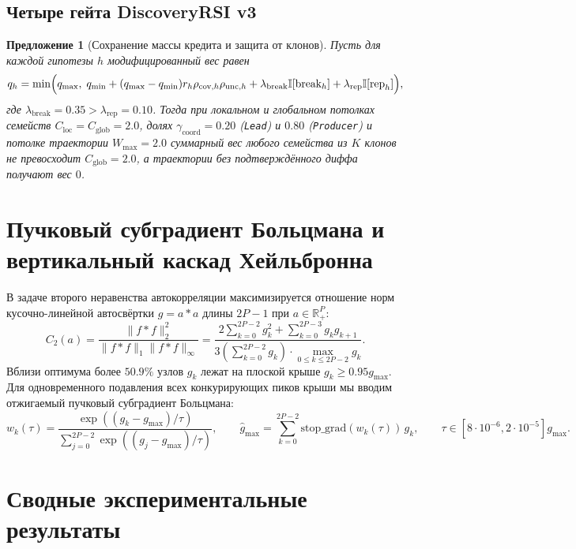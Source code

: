 \documentclass[11pt,a4paper]{article}
\newtheorem{proposition}{Предложение}
\begin{document}
\subsection{Четыре гейта DiscoveryRSI v3}
\begin{proposition}[Сохранение массы кредита и защита от клонов]
Пусть для каждой гипотезы $h$ модифицированный вес равен
\begin{equation}
q_h = \min\Bigl(q_{\max}, \; q_{\min} + (q_{\max} - q_{\min}) r_h \rho_{\text{cov}, h} \rho_{\text{unc}, h} + \lambda_{\text{break}}\mathbb{I}[\text{break}_h] + \lambda_{\text{rep}}\mathbb{I}[\text{rep}_h]\Bigr),
\end{equation}
где $\lambda_{\text{break}} = 0.35 > \lambda_{\text{rep}} = 0.10$. Тогда при локальном и глобальном потолках семейств $C_{\text{loc}} = C_{\text{glob}} = 2.0$, долях $\gamma_{\text{coord}} = 0.20$ (\texttt{Lead}) и $0.80$ (\texttt{Producer}) и потолке траектории $W_{\max} = 2.0$ суммарный вес любого семейства из $K$ клонов не превосходит $C_{\text{glob}} = 2.0$, а траектории без подтверждённого диффа получают вес $0$.
\end{proposition}

\section{Пучковый субградиент Больцмана и вертикальный каскад Хейльбронна}

В задаче второго неравенства автокорреляции максимизируется отношение норм кусочно-линейной автосвёртки $g = a * a$ длины $2P-1$ при $a \in \mathbb{R}_+^P$:
\begin{equation}
C_2(a) = \frac{\|f * f\|_2^2}{\|f * f\|_1 \|f * f\|_\infty} = \frac{2\sum_{k=0}^{2P-2} g_k^2 + \sum_{k=0}^{2P-3} g_k g_{k+1}}{3\left(\sum_{k=0}^{2P-2} g_k\right) \cdot \max_{0 \le k \le 2P-2} g_k}.
\end{equation}
Вблизи оптимума более $50.9\%$ узлов $g_k$ лежат на плоской крыше $g_k \ge 0.95 g_{\max}$. Для одновременного подавления всех конкурирующих пиков крыши мы вводим отжигаемый пучковый субградиент Больцмана:
\begin{equation}
w_k(\tau) = \frac{\exp((g_k - g_{\max})/\tau)}{\sum_{j=0}^{2P-2}\exp((g_j - g_{\max})/\tau)}, \qquad \widehat{g}_{\max} = \sum_{k=0}^{2P-2} \text{stop\_grad}(w_k(\tau))\, g_k, \qquad \tau \in [8\cdot 10^{-6}, 2\cdot 10^{-5}] g_{\max}.
\end{equation}

\section{Сводные экспериментальные результаты}
\end{document}

